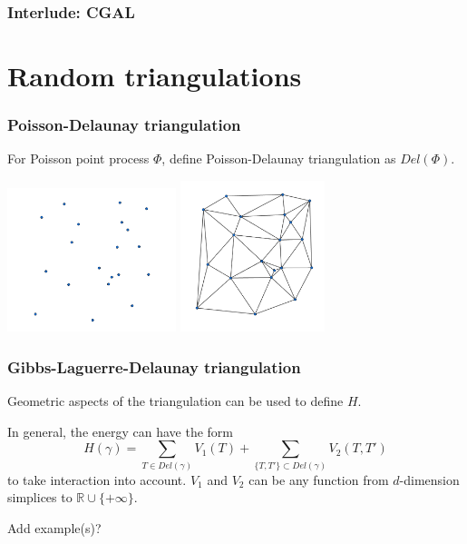 \documentclass[c, 10pt]{beamer}
\begin{document}
\begin{frame}\frametitle{Interlude: CGAL}


\end{frame}




\section{Random triangulations}
\framesection{}


\begin{frame}\frametitle{Poisson-Delaunay triangulation}
For Poisson point process $\Phi$, define \alert{Poisson-Delaunay triangulation} as $Del(\Phi)$.
\begin{center}
\includegraphics[height = 4.2cm]{./FigureLayout/DelaunayBare.png}
\includegraphics[height = 4.4cm]{./FigureLayout/Delaunay.png}
\end{center}
\end{frame}



\begin{frame}\frametitle{Gibbs-Laguerre-Delaunay triangulation}
Geometric aspects of the triangulation can be used to define $H$.

In general, the energy can have the form
$$H(\gamma) = \sum_{T \in Del(\gamma)} V_1(T) + \sum_{\{T,T'\} \subset Del (\gamma)} V_2(T,T')$$
to take interaction into account. 
$V_1$ and $V_2$ can be any function from $d$-dimension simplices to $\mathbb R \cup \{+ \infty \}$. \newline

Add example(s)?

\end{frame}
\end{document}
